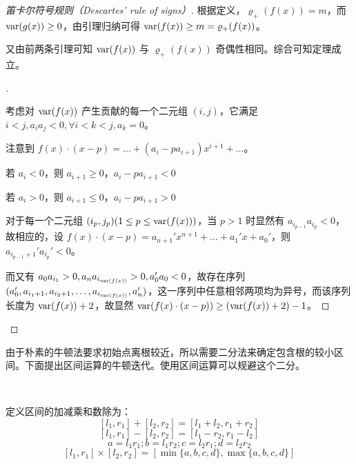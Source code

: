 \begin{proof}[笛卡尔符号规则（Descartes' rule of signs）]
    根据定义，$\varrho_+(f(x)) = m$，而 $\mathrm{var}(g(x)) \geq 0$，由引理归纳可得 $\mathrm{var}(f(x)) \geq m = \varrho_+(f(x))$。

    又由前两条引理可知 $\mathrm{var}(f(x))$ 与 $\varrho_+(f(x))$ 奇偶性相同。综合可知定理成立。
	\qedhere

    \begin{proof}[]~

    考虑对 $\mathrm{var}(f(x))$ 产生贡献的每一个二元组 $(i, j)$，它满足 $i < j, a_ia_j < 0, \forall i < k < j, a_k = 0$。

    注意到 $f(x) \cdot (x-p) = \dots + (a_i -p a_{i+1}) x^{i+1} + \dots$。

    若 $a_i < 0$，则 $a_{i+1} \geq 0$，$a_i -p a_{i+1} < 0$

    若 $a_i > 0$，则 $a_{i+1} \leq 0$，$a_i -p a_{i+1} > 0$

    对于每一个二元组 $(i_p, j_p) (1 \leq p \leq \mathrm{var}(f(x)))$，当 $p>1$ 时显然有 $a_{i_{p-1}}a_{i_p} < 0$，故相应的，设 $f(x) \cdot (x-p) = a_{n+1}'x^{n+1} + \dots + a_1'x + a_0'$，则 $a_{i_{p-1}+1}'a_{i_p}' < 0$。

    而又有 $a_0a_{i_1}>0, a_na_{i_{\mathrm{var}(f(x))}}>0, a_0'a_0<0$，故存在序列 $(a_0', a_{i_1+1}, a_{i_2+1}, \dots, a_{i_{\mathrm{var}(f(x))}}, a_n')$，这一序列中任意相邻两项均为异号，而该序列长度为 $\mathrm{var}(f(x)) + 2$，故显然 $\mathrm{var}(f(x) \cdot (x-p)) \geq (\mathrm{var}(f(x)) + 2) - 1$。

    \end{proof}

    \qedhere

    
\end{proof}

	由于朴素的牛顿法要求初始点离根较近，所以需要二分法来确定包含根的较小区间。下面提出区间运算的牛顿迭代。使用区间运算可以规避这个二分。

\begin{definition}[区间算术]~
	
	定义区间的加减乘和数除为：
	$$
	[l_1, r_1] + [l_2, r_2] = [l_1 + l_2, r_1 + r_2]
	$$
	$$
	[l_1, r_1] - [l_2, r_2] = [l_1 - r_2, r_1 - l_2]
	$$
	$$
	a = l_1 r_1; b = l_1 r_2 ; c = l_2 r_1; d = l_2 r_2
	$$
	$$
	[l_1, r_1] \times [l_2, r_2] = [\min\{a, b, c, d\}, \max\{a, b, c, d\}]
	$$
	
\end{definition}

